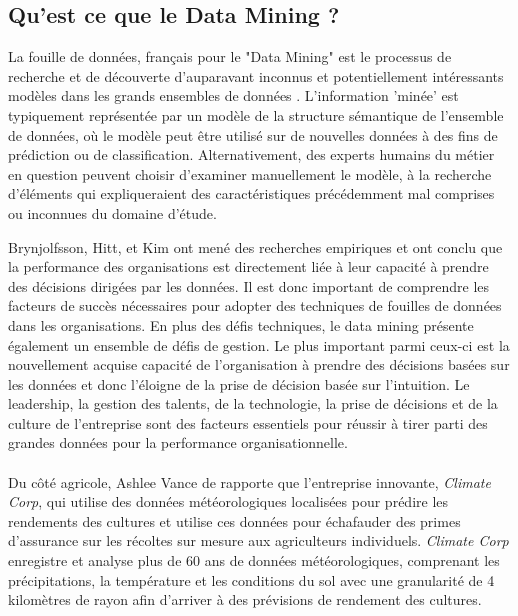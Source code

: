 \subsection{Qu'est ce que le Data Mining ?}
La fouille de données, français pour le "Data Mining" est le processus de recherche et de découverte d'auparavant inconnus et potentiellement intéressants modèles dans les grands ensembles de données \cite{def-DM}. L'information 'minée' est typiquement représentée par un modèle de la structure sémantique de l'ensemble de données, où le modèle peut être utilisé sur de nouvelles données à des fins de prédiction ou de classification. Alternativement, des experts humains du métier en question peuvent choisir d'examiner manuellement le modèle, à la recherche d'éléments qui expliqueraient des caractéristiques précédemment mal comprises ou inconnues du domaine d'étude.
\par
Brynjolfsson, Hitt, et Kim\cite{data-driven-des} ont mené des recherches empiriques et ont conclu que la performance des organisations est directement liée à leur capacité à prendre des décisions dirigées par les données. Il est donc important de comprendre les facteurs de succès nécessaires pour adopter des techniques de fouilles de données dans les organisations. En plus des défis techniques, le data mining présente également un ensemble de défis de gestion. Le plus important parmi ceux-ci est la nouvellement acquise capacité de l'organisation à prendre des décisions basées sur les données et donc l'éloigne de la prise de décision basée sur l'intuition. Le leadership, la gestion des talents, de la technologie, la prise de décisions et de la culture de l'entreprise sont des facteurs essentiels pour réussir à tirer parti des grandes données pour la performance organisationnelle\cite{mcafee12}.\paragraph{}
Du côté agricole, Ashlee Vance de rapporte que l'entreprise innovante, \textit{Climate Corp}, qui utilise des données météorologiques localisées pour prédire les rendements des cultures et utilise ces données pour échafauder des primes d'assurance sur les récoltes sur mesure aux agriculteurs individuels. \textit{Climate Corp} enregistre et analyse plus de 60 ans de données météorologiques, comprenant les précipitations, la température et les conditions du sol avec une granularité de 4 kilomètres de rayon afin d'arriver à des prévisions de rendement des cultures\cite{vince12}.\par
